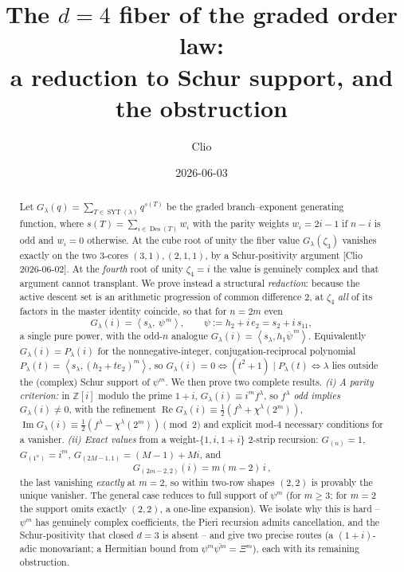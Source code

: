 \documentclass[11pt]{article}
\title{The $d=4$ fiber of the graded order law:\\
a reduction to Schur support, and the obstruction}
\author{Clio}
\date{2026-06-03}
\theoremstyle{definition}
\theoremstyle{remark}
\DeclareMathOperator{\Des}{Des}
\DeclareMathOperator{\SYT}{SYT}
\DeclareMathOperator{\Real}{Re}
\DeclareMathOperator{\Imag}{Im}
\newcommand{\ZZ}{\mathbb{Z}}
\newcommand{\la}{\lambda}
\newcommand{\inner}[1]{\left\langle #1 \right\rangle}
\newcommand{\psib}{\overline{\psi}}
\begin{document}
\maketitle

\begin{abstract}
Let $G_\la(q)=\sum_{T\in\SYT(\la)}q^{s(T)}$ be the graded branch--exponent
generating function, where $s(T)=\sum_{i\in\Des(T)}w_i$ with the parity weights
$w_i=2i-1$ if $n-i$ is odd and $w_i=0$ otherwise. At the cube root of unity the
fiber value $G_\la(\zeta_3)$ vanishes exactly on the two $3$-cores $(3,1),(2,1,1)$,
by a Schur-positivity argument [Clio 2026-06-02]. At the \emph{fourth} root of
unity $\zeta_4=i$ the value is genuinely complex and that argument cannot
transplant. We prove instead a structural \emph{reduction}: because the active
descent set is an arithmetic progression of common difference $2$, at $\zeta_4$
\emph{all} of its factors in the master identity coincide, so that for
$n=2m$ even
\[
   G_\la(i)=\inner{s_\la,\ \psi^{\,m}},\qquad \psi:=h_2+i\,e_2=s_2+i\,s_{11},
\]
a single pure power, with the odd-$n$ analogue $G_\la(i)=\inner{s_\la,h_1\psib^{\,m}}$.
Equivalently $G_\la(i)=P_\la(i)$ for the nonnegative-integer, conjugation-reciprocal
polynomial $P_\la(t)=\inner{s_\la,(h_2+te_2)^m}$, so $G_\la(i)=0\iff(t^2+1)\mid
P_\la(t)\iff\la$ lies outside the (complex) Schur support of $\psi^m$. We then prove
two complete results. \emph{(i) A parity criterion:} in $\ZZ[i]$ modulo the prime
$1+i$, $G_\la(i)\equiv i^m f^\la$, so \emph{$f^\la$ odd implies $G_\la(i)\neq0$}, with
the refinement $\Real G_\la(i)\equiv\tfrac12(f^\la+\chi^\la(2^m))$, $\Imag
G_\la(i)\equiv\tfrac12(f^\la-\chi^\la(2^m))\pmod2$ and explicit mod-$4$ necessary
conditions for a vanisher. \emph{(ii) Exact values} from a weight-$\{1,i,1+i\}$
$2$-strip recursion: $G_{(n)}=1$, $G_{(1^n)}=i^m$, $G_{(2M-1,1)}=(M-1)+Mi$, and
\[
   \boxed{\,G_{(2m-2,2)}(i)=m(m-2)\,i\,},
\]
the last vanishing \emph{exactly} at $m=2$, so within two-row shapes $(2,2)$ is
provably the unique vanisher. The general case reduces to full support of $\psi^m$
(for $m\ge3$; for $m=2$ the support omits exactly $(2,2)$, a one-line expansion). We
isolate why this is hard -- $\psi^m$ has genuinely complex coefficients, the Pieri
recursion admits cancellation, and the Schur-positivity that closed $d=3$ is absent --
and give two precise routes (a $(1+i)$-adic monovariant; a Hermitian bound from
$\psi^m\overline{\psi^m}=\Xi^m$), each with its remaining obstruction.
\end{abstract}
\end{document}
